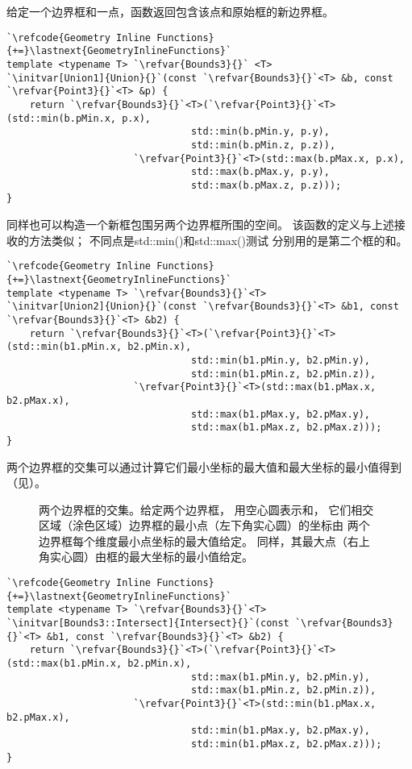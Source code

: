 给定一个边界框和一点，函数返回包含该点和原始框的新边界框。
\begin{lstlisting}
`\refcode{Geometry Inline Functions}{+=}\lastnext{GeometryInlineFunctions}`
template <typename T> `\refvar{Bounds3}{}` <T>
`\initvar[Union1]{Union}{}`(const `\refvar{Bounds3}{}`<T> &b, const `\refvar{Point3}{}`<T> &p) {
    return `\refvar{Bounds3}{}`<T>(`\refvar{Point3}{}`<T>(std::min(b.pMin.x, p.x),
                                std::min(b.pMin.y, p.y),
                                std::min(b.pMin.z, p.z)),
                      `\refvar{Point3}{}`<T>(std::max(b.pMax.x, p.x),
                                std::max(b.pMax.y, p.y),
                                std::max(b.pMax.z, p.z)));
}
\end{lstlisting}

同样也可以构造一个新框包围另两个边界框所围的空间。
该函数的定义与上述接收的方法类似；
不同点是{\ttfamily std::min()}和{\ttfamily std::max()}测试
分别用的是第二个框的和。
\begin{lstlisting}
`\refcode{Geometry Inline Functions}{+=}\lastnext{GeometryInlineFunctions}`
template <typename T> `\refvar{Bounds3}{}`<T>
`\initvar[Union2]{Union}{}`(const `\refvar{Bounds3}{}`<T> &b1, const `\refvar{Bounds3}{}`<T> &b2) {
    return `\refvar{Bounds3}{}`<T>(`\refvar{Point3}{}`<T>(std::min(b1.pMin.x, b2.pMin.x),
                                std::min(b1.pMin.y, b2.pMin.y),
                                std::min(b1.pMin.z, b2.pMin.z)),
                      `\refvar{Point3}{}`<T>(std::max(b1.pMax.x, b2.pMax.x),
                                std::max(b1.pMax.y, b2.pMax.y),
                                std::max(b1.pMax.z, b2.pMax.z)));
}
\end{lstlisting}

两个边界框的交集可以通过计算它们最小坐标的最大值和最大坐标的最小值得到（见）。
\begin{figure}[htbp]
    \centering
    \caption{两个边界框的交集。给定两个边界框，
        用空心圆表示\protect{}和\protect{}，
        它们相交区域（涂色区域）边界框的最小点（左下角实心圆）的坐标由
        两个边界框每个维度最小点坐标的最大值给定。
        同样，其最大点（右上角实心圆）由框的最大坐标的最小值给定。}
    \label{fig:2.9}
\end{figure}

\begin{lstlisting}
`\refcode{Geometry Inline Functions}{+=}\lastnext{GeometryInlineFunctions}`
template <typename T> `\refvar{Bounds3}{}`<T>
`\initvar[Bounds3::Intersect]{Intersect}{}`(const `\refvar{Bounds3}{}`<T> &b1, const `\refvar{Bounds3}{}`<T> &b2) {
    return `\refvar{Bounds3}{}`<T>(`\refvar{Point3}{}`<T>(std::max(b1.pMin.x, b2.pMin.x),
                                std::max(b1.pMin.y, b2.pMin.y),
                                std::max(b1.pMin.z, b2.pMin.z)),
                      `\refvar{Point3}{}`<T>(std::min(b1.pMax.x, b2.pMax.x),
                                std::min(b1.pMax.y, b2.pMax.y),
                                std::min(b1.pMax.z, b2.pMax.z)));
}
\end{lstlisting}

